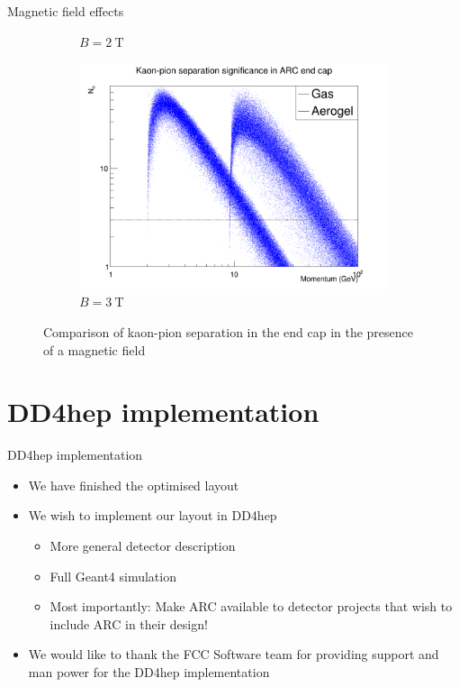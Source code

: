 \documentclass{beamer}
\begin{document}
\begin{frame}{Magnetic field effects}
\begin{figure}
\begin{subfigure}{0.33\textwidth}
      \caption{$B = \SI{2}{\tesla}$}
    \end{subfigure}%
    \begin{subfigure}{0.33\textwidth}
      \includegraphics[width = 1.0\textwidth]{Plots/Significance_Scatter_PionKaon_EndCap_MagOn_3T.png}
      \caption{$B = \SI{3}{\tesla}$}
    \end{subfigure}
    \caption{Comparison of kaon-pion separation in the end cap in the presence of a magnetic field}
  \end{figure}
\end{frame}

\section{DD4hep implementation}
\begin{frame}{DD4hep implementation}
  \begin{itemize}
    \setlength\itemsep{1.0em}
    \item{We have finished the optimised layout}
    \item{We wish to implement our layout in DD4hep}
    \begin{itemize}
      \setlength\itemsep{0.5em}
      \item{More general detector description}
      \item{Full Geant4 simulation}
      \item{Most importantly: Make ARC available to detector projects that wish to include ARC in their design!}
    \end{itemize}
    \item{We would like to thank the FCC Software team for providing support and man power for the DD4hep implementation}
  \end{itemize}
\end{frame}
\end{document}

